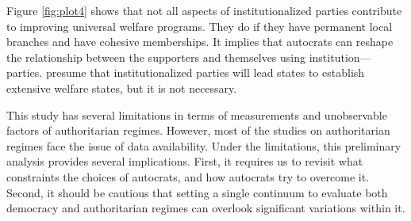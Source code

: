 \documentclass[11pt]{article}
\begin{document}
Figure \ref{fig:plot4} shows that not all aspects of institutionalized parties contribute to improving universal welfare programs. They do if they have permanent local branches and have cohesive memberships. It implies that autocrats can reshape the relationship between the supporters and themselves using institution---parties. \citet{Rasmussen2019} presume that institutionalized parties will lead states to establish extensive welfare states, but it is not necessary.

This study has several limitations in terms of measurements and unobservable factors of authoritarian regimes. However, most of the studies on authoritarian regimes face the issue of data availability. Under the limitations, this preliminary analysis provides several implications. First, it requires us to revisit what constraints the choices of autocrats, and how autocrats try to overcome it. Second, it should be cautious that setting a single continuum to evaluate both democracy and authoritarian regimes can overlook significant variations within it.


\newpage
	
	
\end{document}
